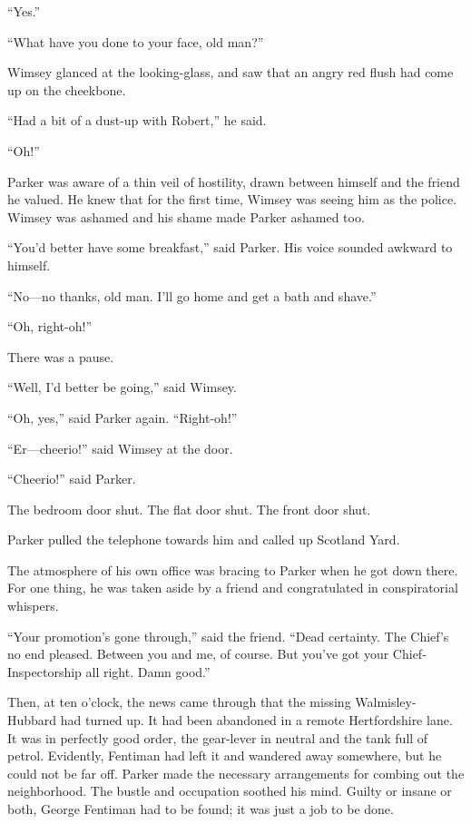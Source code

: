 \enquote{Yes.}

\enquote{What have you done to your face, old man?}

Wimsey glanced at the looking-glass, and saw that an angry red flush had come up on the cheekbone.

\enquote{Had a bit of a dust-up with Robert,} he said.

\enquote{Oh!}

Parker was aware of a thin veil of hostility, drawn between himself and the friend he valued. He knew that for the first time, Wimsey was seeing him as the police. Wimsey was ashamed and his shame made Parker ashamed too.

\enquote{You'd better have some breakfast,} said Parker. His voice sounded awkward to himself.

\enquote{No\allowbreak---\allowbreak no thanks, old man. I'll go home and get a bath and shave.}

\enquote{Oh, right-oh!}

There was a pause.

\enquote{Well, I'd better be going,} said Wimsey.

\enquote{Oh, yes,} said Parker again. \enquote{Right-oh!}

\enquote{Er\allowbreak---\allowbreak cheerio!} said Wimsey at the door.

\enquote{Cheerio!} said Parker.

The bedroom door shut. The flat door shut. The front door shut.

Parker pulled the telephone towards him and called up Scotland Yard.

The atmosphere of his own office was bracing to Parker when he got down there. For one thing, he was taken aside by a friend and congratulated in conspiratorial whispers.

\enquote{Your promotion's gone through,} said the friend. \enquote{Dead certainty. The Chief's no end pleased. Between you and me, of course. But you've got your Chief-Inspectorship all right. Damn good.}

Then, at ten o'clock, the news came through that the missing Walmisley-Hubbard had turned up. It had been abandoned in a remote Hertfordshire lane. It was in perfectly good order, the gear-lever in neutral and the tank full of petrol. Evidently, Fentiman had left it and wandered away somewhere, but he could not be far off. Parker made the necessary arrangements for combing out the neighborhood. The bustle and occupation soothed his mind. Guilty or insane or both, George Fentiman had to be found; it was just a job to be done.

